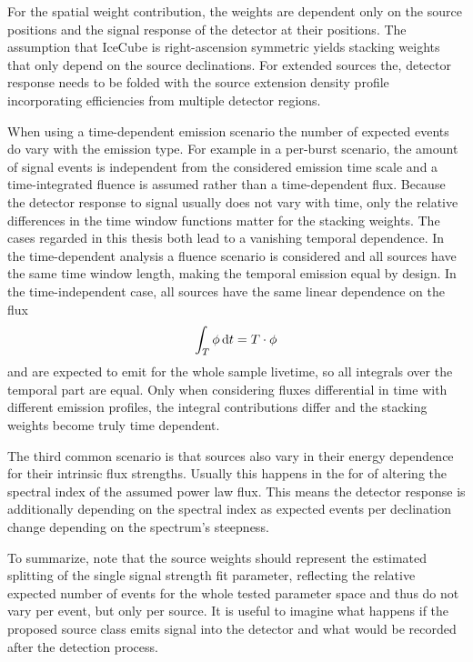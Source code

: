 For the spatial weight contribution, the weights are dependent only on the source positions and the signal response of the detector at their positions.
The assumption that IceCube is right-ascension symmetric yields stacking weights that only depend on the source declinations.
For extended sources the, detector response needs to be folded with the source extension density profile incorporating efficiencies from multiple detector regions.

When using a time-dependent emission scenario the number of expected events do vary with the emission type.
For example in a per-burst scenario, the amount of signal events is independent from the considered emission time scale and a time-integrated fluence is assumed rather than a time-dependent flux.
Because the detector response to signal usually does not vary with time, only the relative differences in the time window functions matter for the stacking weights.
The cases regarded in this thesis both lead to a vanishing temporal dependence.
In the time-dependent analysis a fluence scenario is considered and all sources have the same time window length, making the temporal emission equal by design.
In the time-independent case, all sources have the same linear dependence on the flux
\begin{equation}
  \int_T \phi \,\mathrm{d}t = T\cdot \phi
\end{equation}
and are expected to emit for the whole sample livetime, so all integrals over the temporal part are equal.
Only when considering fluxes differential in time with different emission profiles, the integral contributions differ and the stacking weights become truly time dependent.

The third common scenario is that sources also vary in their energy dependence for their intrinsic flux strengths.
Usually this happens in the for of altering the spectral index of the assumed power law flux.
This means the detector response is additionally depending on the spectral index as expected events per declination change depending on the spectrum's steepness.

To summarize, note that the source weights should represent the estimated splitting of the single signal strength fit parameter, reflecting the relative expected number of events for the whole tested parameter space and thus do not vary per event, but only per source.
It is useful to imagine what happens if the proposed source class emits signal into the detector and what would be recorded after the detection process.

